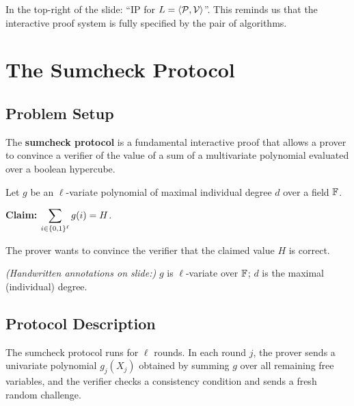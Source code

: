 \documentclass[11pt]{article}
\begin{document}
\begin{remark}
  In the top-right of the slide: ``IP for $L = \langle \mathcal{P}, \mathcal{V} \rangle$''. This
  reminds us that the interactive proof system is fully specified by the pair of algorithms.
\end{remark}

\section{The Sumcheck Protocol}

\subsection{Problem Setup}

The \textbf{sumcheck protocol} is a fundamental interactive proof that allows a prover to convince
a verifier of the value of a sum of a multivariate polynomial evaluated over a boolean hypercube.

\medskip

\begin{tcolorbox}[colback=blue!5!white, colframe=blue!60!black, title={Sumcheck Problem Statement}]
  Let $g$ be an $\ell$-variate polynomial of maximal individual degree $d$ over a field $\mathbb{F}$.
  \medskip

  \textbf{Claim:} $\displaystyle\sum_{i \in \{0,1\}^\ell} g(i) = H$.

  \medskip
  The prover wants to convince the verifier that the claimed value $H$ is correct.
\end{tcolorbox}

\medskip
\textit{(Handwritten annotations on slide:)} $g$ is $\ell$-variate over $\mathbb{F}$; $d$ is the maximal
(individual) degree.

\subsection{Protocol Description}

The sumcheck protocol runs for $\ell$ rounds. In each round $j$, the prover sends a univariate
polynomial $g_j(X_j)$ obtained by summing $g$ over all remaining free variables, and the verifier
checks a consistency condition and sends a fresh random challenge.

\bigskip
\end{document}
